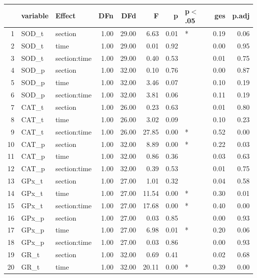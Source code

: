 \begin{table}[ht]
\centering
\begin{tabular}{rllrrrrlrr}
  \hline
 & variable & Effect & DFn & DFd & F & p & p$<$.05 & ges & p.adj \\ 
  \hline
1 & SOD\_t & section & 1.00 & 29.00 & 6.63 & 0.01 & * & 0.19 & 0.06 \\ 
  2 & SOD\_t & time & 1.00 & 29.00 & 0.01 & 0.92 &  & 0.00 & 0.95 \\ 
  3 & SOD\_t & section:time & 1.00 & 29.00 & 0.40 & 0.53 &  & 0.01 & 0.75 \\ 
  4 & SOD\_p & section & 1.00 & 32.00 & 0.10 & 0.76 &  & 0.00 & 0.87 \\ 
  5 & SOD\_p & time & 1.00 & 32.00 & 3.46 & 0.07 &  & 0.10 & 0.19 \\ 
  6 & SOD\_p & section:time & 1.00 & 32.00 & 3.81 & 0.06 &  & 0.11 & 0.19 \\ 
  7 & CAT\_t & section & 1.00 & 26.00 & 0.23 & 0.63 &  & 0.01 & 0.80 \\ 
  8 & CAT\_t & time & 1.00 & 26.00 & 3.02 & 0.09 &  & 0.10 & 0.23 \\ 
  9 & CAT\_t & section:time & 1.00 & 26.00 & 27.85 & 0.00 & * & 0.52 & 0.00 \\ 
  10 & CAT\_p & section & 1.00 & 32.00 & 8.89 & 0.00 & * & 0.22 & 0.03 \\ 
  11 & CAT\_p & time & 1.00 & 32.00 & 0.86 & 0.36 &  & 0.03 & 0.63 \\ 
  12 & CAT\_p & section:time & 1.00 & 32.00 & 0.39 & 0.53 &  & 0.01 & 0.75 \\ 
  13 & GPx\_t & section & 1.00 & 27.00 & 1.01 & 0.32 &  & 0.04 & 0.58 \\ 
  14 & GPx\_t & time & 1.00 & 27.00 & 11.54 & 0.00 & * & 0.30 & 0.01 \\ 
  15 & GPx\_t & section:time & 1.00 & 27.00 & 17.68 & 0.00 & * & 0.40 & 0.00 \\ 
  16 & GPx\_p & section & 1.00 & 27.00 & 0.03 & 0.85 &  & 0.00 & 0.93 \\ 
  17 & GPx\_p & time & 1.00 & 27.00 & 6.98 & 0.01 & * & 0.20 & 0.06 \\ 
  18 & GPx\_p & section:time & 1.00 & 27.00 & 0.03 & 0.86 &  & 0.00 & 0.93 \\ 
  19 & GR\_t & section & 1.00 & 32.00 & 0.69 & 0.41 &  & 0.02 & 0.68 \\ 
  20 & GR\_t & time & 1.00 & 32.00 & 20.11 & 0.00 & * & 0.39 & 0.00 \\ 

\end{tabular}
\end{table}
